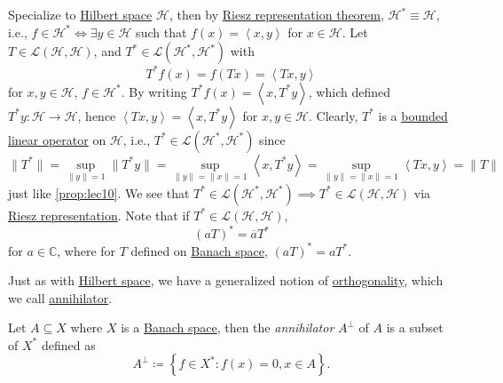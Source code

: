 \begin{remark}
	Specialize to \hyperref[def:Hilbert-space]{Hilbert space} \(\mathcal{H} \), then by \hyperref[thm:Riesz-representation]{Riesz representation theorem}, \(\mathcal{H} ^{\ast} \equiv \mathcal{H} \), i.e., \(f\in \mathcal{H} ^{\ast} \iff \exists y\in \mathcal{H} \) such that \(f(x) = \left\langle x, y \right\rangle \) for \(x\in \mathcal{H} \). Let \(T\in \mathcal{L} (\mathcal{H} , \mathcal{H} )\), and \(T^{\ast} \in \mathcal{L} (\mathcal{H} ^{\ast} , \mathcal{H} ^{\ast} )\) with
	\[
		T^{\ast} f(x) = f(Tx) = \left\langle Tx, y \right\rangle
	\]
	for \(x, y\in \mathcal{H} \), \(f\in \mathcal{H} ^{\ast} \). By writing \(T^{\ast} f(x) = \left\langle x, T^{\ast} y \right\rangle \), which defined \(T^{\ast} y\colon \mathcal{H} \to \mathcal{H} \), hence \(\left\langle Tx, y \right\rangle = \left\langle x, T^{\ast} y \right\rangle  \) for \(x, y\in \mathcal{H}\). Clearly, \(T^{\ast} \) is a \hyperref[def:bounded-linear-op]{bounded linear operator} on \(\mathcal{H} \), i.e., \(T^{\ast} \in \mathcal{L} (\mathcal{H}^{\ast} , \mathcal{H}^{\ast} )\) since
	\[
		\lVert T^{\ast} \rVert
		= \sup _{\lVert y\rVert = 1} \lVert T^{\ast} y\rVert
		= \sup _{\lVert y\rVert = \lVert x\rVert = 1} \left\langle x, T^{\ast} y \right\rangle
		= \sup _{\lVert y\rVert = \lVert x\rVert = 1}\left\langle Tx, y \right\rangle
		= \lVert T\rVert
	\]
	just like \autoref{prop:lec10}. We see that \(T^{\ast} \in \mathcal{L} (\mathcal{H} ^{\ast} , \mathcal{H} ^{\ast} )\implies T^{\ast} \in \mathcal{L} (\mathcal{H} , \mathcal{H} )\) via \hyperref[thm:Riesz-representation]{Riesz representation}. Note that if \(T^{\ast} \in \mathcal{L} (\mathcal{H} , \mathcal{H} )\),
	\[
		(aT)^{\ast} = \overline{a} T^{\ast}
	\]
	for \(a\in \mathbb{C} \), where for \(T\) defined on \hyperref[def:Banach-space]{Banach space}, \((aT)^{\ast} = aT^{\ast} \).
\end{remark}

Just as with \hyperref[def:Hilbert-space]{Hilbert space}, we have a generalized notion of \hyperref[def:orthogonal]{orthogonality}, which we call \hyperref[def:annihilator]{annihilator}.

\begin{definition}[Annihilator]\label{def:annihilator}
	Let \(A \subseteq X\) where \(X\) is a \hyperref[def:Banach-space]{Banach space}, then the \emph{annihilator} \(A^\perp\) of \(A\) is a subset of \(X^{\ast} \) defined as
	\[
		A^\perp \coloneqq \left\{ f\in X^{\ast} \colon f(x) = 0, x\in A \right\}.
	\]
\end{definition}

